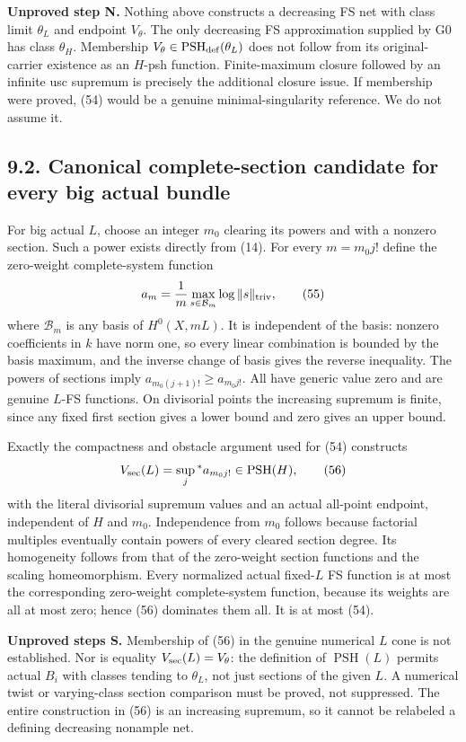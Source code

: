 \documentclass[
  10pt,
]{article}
\begin{document}
\textbf{Unproved step N.} Nothing above constructs a decreasing FS net
with class limit \(\theta_L\) and endpoint \(V_\theta\). The only
decreasing FS approximation supplied by G0 has class \(\theta_H\).
Membership \(V_\theta\in\operatorname{PSH}_{\rm def}(\theta_L)\) does
not follow from its original-carrier existence as an \(H\)-psh function.
Finite-maximum closure followed by an infinite usc supremum is precisely
the additional closure issue. If membership were proved, (54) would be a
genuine minimal-singularity reference. We do not assume it.

\subsection{9.2. Canonical complete-section candidate for every big
actual
bundle}\label{canonical-complete-section-candidate-for-every-big-actual-bundle}

For big actual \(L\), choose an integer \(m_0\) clearing its powers and
with a nonzero section. Such a power exists directly from (14). For
every \(m=m_0 j!\) define the zero-weight complete-system function
\[a_m=\frac1m\max_{s\in\mathcal B_m}\log\|s\|_{\rm triv},\tag{55}\]
where \(\mathcal B_m\) is any basis of \(H^0(X,mL)\). It is independent
of the basis: nonzero coefficients in \(k\) have norm one, so every
linear combination is bounded by the basis maximum, and the inverse
change of basis gives the reverse inequality. The powers of sections
imply \(a_{m_0(j+1)!}\geq a_{m_0j!}\). All have generic value zero and
are genuine \(L\)-FS functions. On divisorial points the increasing
supremum is finite, since any fixed first section gives a lower bound
and zero gives an upper bound.

Exactly the compactness and obstacle argument used for (54) constructs
\[V_{\rm sec}(L)=\sup_j{}^*a_{m_0j!}\in\operatorname{PSH}(H),\tag{56}\]
with the literal divisorial supremum values and an actual all-point
endpoint, independent of \(H\) and \(m_0\). Independence from \(m_0\)
follows because factorial multiples eventually contain powers of every
cleared section degree. Its homogeneity follows from that of the
zero-weight section functions and the scaling homeomorphism. Every
normalized actual fixed-\(L\) FS function is at most the corresponding
zero-weight complete-system function, because its weights are all at
most zero; hence (56) dominates them all. It is at most (54).

\textbf{Unproved steps S.} Membership of (56) in the genuine numerical
\(L\) cone is not established. Nor is equality
\(V_{\rm sec}(L)=V_\theta\): the definition of \(\operatorname{PSH}(L)\)
permits actual \(B_i\) with classes tending to \(\theta_L\), not just
sections of the given \(L\). A numerical twist or varying-class section
comparison must be proved, not suppressed. The entire construction in
(56) is an increasing supremum, so it cannot be relabeled a defining
decreasing nonample net.
\end{document}

